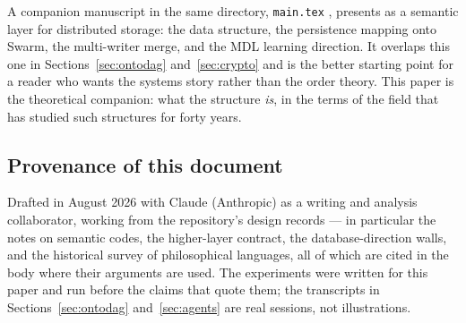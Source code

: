 A companion manuscript in the same directory, \texttt{main.tex}
\citep{ontodagswarm}, presents \odag{} as a semantic layer for distributed
storage: the data structure, the persistence mapping onto Swarm, the
multi-writer merge, and the MDL learning direction. It overlaps this one in
Sections~\ref{sec:ontodag} and~\ref{sec:crypto} and is the better starting
point for a reader who wants the systems story rather than the order theory.
This paper is the theoretical companion: what the structure \emph{is}, in the
terms of the field that has studied such structures for forty years.

\subsection*{Provenance of this document}

Drafted in August 2026 with Claude (Anthropic) as a writing and analysis
collaborator, working from the \odag{} repository's design records --- in
particular the notes on semantic codes, the higher-layer contract, the
database-direction walls, and the historical survey of philosophical
languages, all of which are cited in the body where their arguments are used.
The experiments were written for this paper and run before the claims that
quote them; the transcripts in Sections~\ref{sec:ontodag}
and~\ref{sec:agents} are real sessions, not illustrations.
